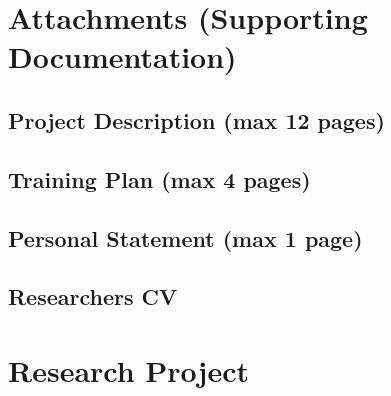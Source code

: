 \documentclass[11pt,twoside,a4paper]{article}
\begin{document}
\section{Attachments (Supporting Documentation)}

\subsection{Project Description (max 12 pages)}


\subsection{Training Plan (max 4 pages)}


\subsection{Personal Statement (max 1 page)}


\subsection{Researchers CV}








\clearpage




\section*{Research Project}
\end{document}
